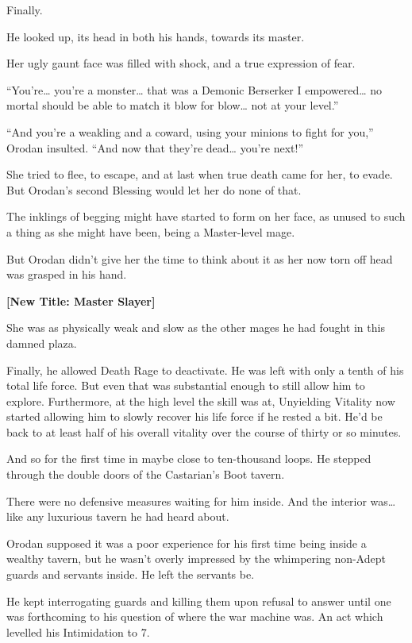 \documentclass[a4paper,10pt]{book}
\begin{document}
Finally.\par
He looked up, its head in both his hands, towards its master.\par
Her ugly gaunt face was filled with shock, and a true expression of fear.\par
“You’re… you’re a monster… that was a Demonic Berserker I empowered… no mortal should be able to match it blow for blow… not at your level.”\par
“And you’re a weakling and a coward, using your minions to fight for you,” Orodan insulted. “And now that they’re dead… you’re next!”\par
She tried to flee, to escape, and at last when true death came for her, to evade. But Orodan’s second Blessing would let her do none of that.\par
The inklings of begging might have started to form on her face, as unused to such a thing as she might have been, being a Master-level mage.\par
But Orodan didn’t give her the time to think about it as her now torn off head was grasped in his hand.\par
\textbf{[New Title: Master Slayer]}\par
She was as physically weak and slow as the other mages he had fought in this damned plaza.\par
Finally, he allowed Death Rage to deactivate. He was left with only a tenth of his total life force. But even that was substantial enough to still allow him to explore. Furthermore, at the high level the skill was at, Unyielding Vitality now started allowing him to slowly recover his life force if he rested a bit. He’d be back to at least half of his overall vitality over the course of thirty or so minutes.\par
And so for the first time in maybe close to ten-thousand loops. He stepped through the double doors of the Castarian’s Boot tavern.\par
\par
There were no defensive measures waiting for him inside. And the interior was… like any luxurious tavern he had heard about.\par
Orodan supposed it was a poor experience for his first time being inside a wealthy tavern, but he wasn’t overly impressed by the whimpering non-Adept guards and servants inside. He left the servants be.\par
He kept interrogating guards and killing them upon refusal to answer until one was forthcoming to his question of where the war machine was. An act which levelled his Intimidation to 7.\par
\end{document}
